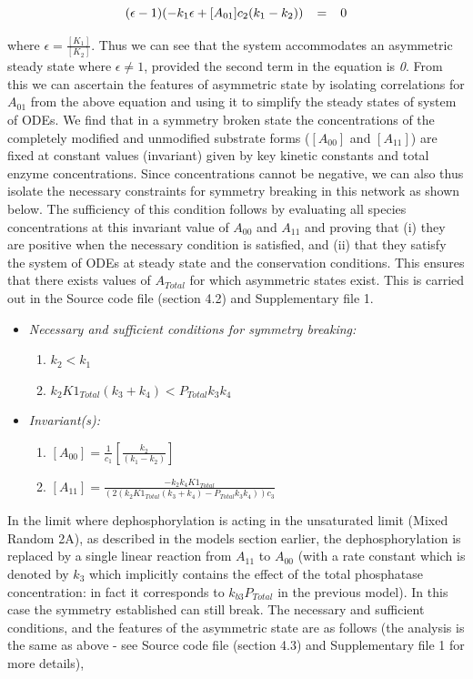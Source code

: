 \documentclass[9pt,lineno]{elife}
\begin{document}
\begin{appendixbox}
\begin{equation}
    \scriptsize{  (\epsilon-1)(-k_1\epsilon+[A_{01}]c_2(k_1-k_2)) \quad = \quad 0}
\end{equation}

where $\epsilon = \frac{[K_1]}{[K_2]}$. Thus we can see that the system accommodates an asymmetric steady state where $\epsilon \neq 1$, provided the second term in the equation is \textit{0}. From this we can ascertain the features of asymmetric state  by isolating correlations for $A_{01}$ from the above equation and using it to simplify the steady states of  system of ODEs. We find that in a symmetry broken state the concentrations of the completely modified and unmodified substrate forms ($[A_{00}]$ and $[A_{11}]$) are fixed at  constant values (invariant) given by key kinetic constants and total enzyme concentrations. Since concentrations cannot be negative, we can also thus isolate the necessary constraints for symmetry breaking in this network as shown below. The sufficiency of this condition follows by evaluating all species concentrations at this invariant value of $A_{00}$ and $A_{11}$ and proving that (i) they are positive when the necessary condition is satisfied, and (ii) that they satisfy the system of ODEs at steady state and the conservation conditions. This ensures that there exists values of $A_{Total}$ for which asymmetric states exist. This is carried out in the Source code file (section 4.2) and Supplementary file 1.

\begin{itemize}
    \item \textit{Necessary and sufficient conditions for symmetry breaking:}
    \begin{enumerate}
        \item $k_2 < k_1$ 
        \item $k_2K1_{Total}(k_3+k_4) < P_{Total}k_3k_4$
    \end{enumerate}
        \item \textit{Invariant(s):} 
    \begin{enumerate}
        \item $[A_{00}] = \frac{1}{c_1}\left[\frac{k_2}{(k_1-k_2)}\right]$
        \item $[A_{11}] = \frac{-k_2k_4K1_{Total}}{(2(k_2K1_{Total}(k_3+k_4)-P_{Total}k_3k_4))c_3}$
    \end{enumerate}
\end{itemize}

In the limit where dephosphorylation is acting in the unsaturated limit (Mixed Random 2A), as described in the models section earlier, the  dephosphorylation is replaced by a single linear reaction from $A_{11}$ to $A_{00}$ (with a rate constant which is denoted by $k_3$ which implicitly contains the effect of the total phosphatase concentration: in fact it corresponds to $k_{b3}P_{Total}$ in the previous model). In this case the symmetry established can still break. The necessary and sufficient conditions, and the features of the asymmetric state are as follows (the analysis is the same as above - see Source code file (section 4.3) and Supplementary file 1 for more details), 


\end{appendixbox}
\end{document}
